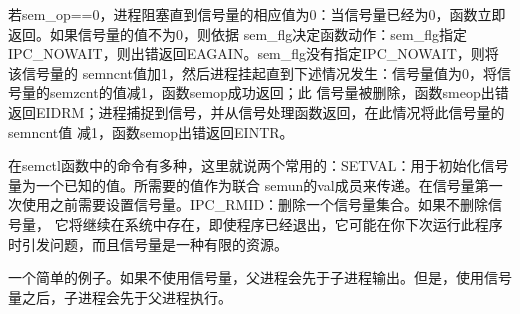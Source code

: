 若sem\_op==0，进程阻塞直到信号量的相应值为0：当信号量已经为0，函数立即返回。如果信号量的值不为0，则依据
sem\_flg决定函数动作：sem\_flg指定IPC\_NOWAIT，则出错返回EAGAIN。sem\_flg没有指定IPC\_NOWAIT，则将该信号量的
semncnt值加1，然后进程挂起直到下述情况发生：信号量值为0，将信号量的semzcnt的值减1，函数semop成功返回；此
信号量被删除，函数smeop出错返回EIDRM；进程捕捉到信号，并从信号处理函数返回，在此情况将此信号量的semncnt值
减1，函数semop出错返回EINTR。

在semctl函数中的命令有多种，这里就说两个常用的：SETVAL：用于初始化信号量为一个已知的值。所需要的值作为联合
semun的val成员来传递。在信号量第一次使用之前需要设置信号量。IPC\_RMID：删除一个信号量集合。如果不删除信号量，
它将继续在系统中存在，即使程序已经退出，它可能在你下次运行此程序时引发问题，而且信号量是一种有限的资源。

一个简单的例子。如果不使用信号量，父进程会先于子进程输出。但是，使用信号量之后，子进程会先于父进程执行。
